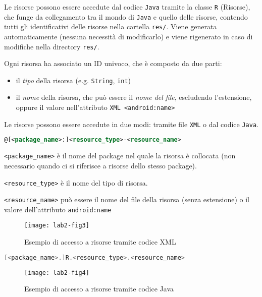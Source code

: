 Le risorse possono essere accedute dal codice \texttt{Java} tramite la classe
\texttt{R} (Risorse), che funge da collegamento tra il mondo di \texttt{Java} e
quello delle risorse, contendo tutti gli identificativi delle risorse nella
cartella \texttt{res/}. Viene generata automaticamente (nessuna necessità di
modificarlo) e viene rigenerato in caso di modifiche nella directory
\texttt{res/}.

Ogni risorsa ha associato un ID univoco, che è composto da due parti:
\begin{itemize}
\item il \textit{tipo} della risorsa (e.g. \texttt{String}, \texttt{int})
\item il \textit{nome} della risorsa, che può essere il \textit{nome del file},
escludendo l'estensione, oppure il valore nell'attributo \texttt{XML
<android:name>}
\end{itemize}

Le risorse possono essere accedute in due modi: tramite file \texttt{XML} o dal
codice \texttt{Java}.



\begin{lstlisting}[language=XML]
@[<package_name>:]<resource_type>-<resource_name>
\end{lstlisting}

\texttt{<package\_name>} è il nome del package nel quale la risorsa è collocata
(non necessario quando ci si riferisce a risorse dello stesso package).

\texttt{<resource\_type>} è il nome del tipo di risorsa.

\texttt{<resource\_name>} può essere il nome del file della risorsa (senza
estensione) o il valore dell'attributo \texttt{android:name}

\begin{figure}[htbp]
        \centering
        \texttt{[image: lab2-fig3]}
        \caption[Accesso Risorse XML]{Esempio di accesso a risorse tramite
codice XML}\label{img:lab2-fig3}
\end{figure}


\begin{lstlisting}[language=Java]
[<package_name>.]R.<resource_type>.<resource_name>
\end{lstlisting}

\begin{figure}[htbp]
        \centering
        \texttt{[image: lab2-fig4]}
        \caption[Accesso Risorse Java]{Esempio di accesso a risorse tramite
codice Java}\label{img:lab2-fig4}
\end{figure}

